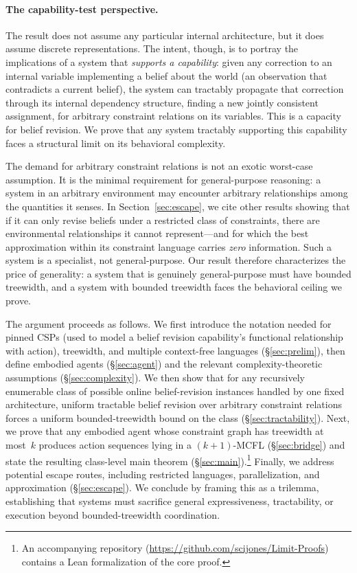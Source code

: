 \documentclass[runningheads]{llncs}
\begin{document}
\paragraph{The capability-test perspective.}
The result does not assume any particular internal architecture, but it does assume discrete representations.
The intent, though, is to portray the implications of a system that \emph{supports a capability}: given any correction to an internal variable implementing a belief about the world (an observation that contradicts a current belief), the system can tractably propagate that correction through its internal dependency structure, finding a new jointly consistent assignment, for arbitrary constraint relations on its variables.
This is a capacity for belief revision.
We prove that any system tractably supporting this capability faces a structural limit on its behavioral complexity.

The demand for arbitrary constraint relations is not an exotic worst-case assumption.
It is the minimal requirement for general-purpose reasoning: a system in an arbitrary environment may encounter arbitrary relationships among the quantities it senses.
In Section~\ref{sec:escape}, we cite other results showing that if it can only revise beliefs under a restricted class of constraints, there are environmental relationships it cannot represent---and for which the best approximation within its constraint language carries \emph{zero} information. Such a system is a specialist, not general-purpose. Our result therefore characterizes the price of generality: a system that is genuinely general-purpose must have bounded treewidth, and a system with bounded treewidth faces the behavioral ceiling we prove.

The argument proceeds as follows.
We first introduce the notation needed for pinned CSPs (used to model a belief revision capability's functional relationship with action), treewidth, and multiple context-free languages (\S\ref{sec:prelim}), then define embodied agents (\S\ref{sec:agent}) and the relevant complexity-theoretic assumptions (\S\ref{sec:complexity}).
We then show that for any recursively enumerable class of possible online belief-revision instances handled by one fixed architecture, uniform tractable belief revision over arbitrary constraint relations forces a uniform bounded-treewidth bound on the class (\S\ref{sec:tractability}).
Next, we prove that any embodied agent whose constraint graph has treewidth at most~$k$ produces action sequences lying in a $(k{+}1)$-MCFL (\S\ref{sec:bridge}) and state the resulting class-level main theorem (\S\ref{sec:main}).\footnote{An accompanying repository (\url{https://github.com/scijones/Limit-Proofs}) contains a Lean formalization of the core proof.}
Finally, we address potential escape routes, including restricted languages, parallelization, and approximation (\S\ref{sec:escape}). We conclude by framing this as a trilemma, establishing that systems must sacrifice general expressiveness, tractability, or execution beyond bounded-treewidth coordination. 
\end{document}
